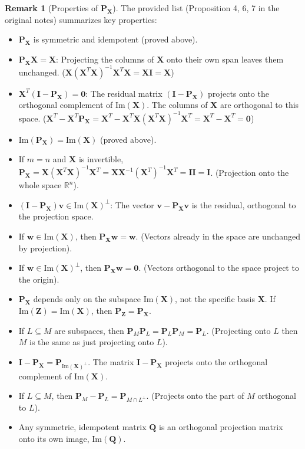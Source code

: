 \documentclass[12pt, letterpaper]{article}
\theoremstyle{definition}
\newtheorem{remark}{Remark}[section]
\newcommand{\R}{\mathbb{R}}
\newcommand{\mat}[1]{\mathbf{#1}} %
\newcommand{\vect}[1]{\mathbf{#1}} %
\renewcommand{\v}{\vect{v}} %
\newcommand{\w}{\vect{w}} %
\newcommand{\im}{\text{Im}}
\begin{document}
\begin{remark}[Properties of $\mat{P}_\mat{X}$]
The provided list (Proposition 4, 6, 7 in the original notes) summarizes key properties:
\begin{itemize}
    \item $\mat{P}_\mat{X}$ is symmetric and idempotent (proved above).
    \item $\mat{P}_\mat{X} \mat{X} = \mat{X}$: Projecting the columns of $\mat{X}$ onto their own span leaves them unchanged. ($\mat{X}(\mat{X}^T \mat{X})^{-1} \mat{X}^T \mat{X} = \mat{X}\mat{I} = \mat{X}$)
    \item $\mat{X}^T (\mat{I} - \mat{P}_\mat{X}) = \mat{0}$: The residual matrix $(\mat{I} - \mat{P}_\mat{X})$ projects onto the orthogonal complement of $\im(\mat{X})$. The columns of $\mat{X}$ are orthogonal to this space. ($\mat{X}^T - \mat{X}^T\mat{P}_\mat{X} = \mat{X}^T - \mat{X}^T\mat{X}(\mat{X}^T \mat{X})^{-1} \mat{X}^T = \mat{X}^T - \mat{X}^T = \mat{0}$)
    \item $\im(\mat{P}_\mat{X}) = \im(\mat{X})$ (proved above).
    \item If $m=n$ and $\mat{X}$ is invertible, $\mat{P}_\mat{X} = \mat{X}(\mat{X}^T \mat{X})^{-1} \mat{X}^T = \mat{X} \mat{X}^{-1} (\mat{X}^T)^{-1} \mat{X}^T = \mat{I} \mat{I} = \mat{I}$. (Projection onto the whole space $\R^n$).
    \item $(\mat{I} - \mat{P}_\mat{X})\v \in \im(\mat{X})^\perp$: The vector $\v - \mat{P}_\mat{X}\v$ is the residual, orthogonal to the projection space.
    \item If $\w \in \im(\mat{X})$, then $\mat{P}_\mat{X}\w = \w$. (Vectors already in the space are unchanged by projection).
    \item If $\w \in \im(\mat{X})^\perp$, then $\mat{P}_\mat{X}\w = \vect{0}$. (Vectors orthogonal to the space project to the origin).
    \item $\mat{P}_\mat{X}$ depends only on the subspace $\im(\mat{X})$, not the specific basis $\mat{X}$. If $\im(\mat{Z}) = \im(\mat{X})$, then $\mat{P}_\mat{Z} = \mat{P}_\mat{X}$.
    \item If $L \subseteq M$ are subspaces, then $\mat{P}_M \mat{P}_L = \mat{P}_L \mat{P}_M = \mat{P}_L$. (Projecting onto $L$ then $M$ is the same as just projecting onto $L$).
    \item $\mat{I} - \mat{P}_\mat{X} = \mat{P}_{\im(\mat{X})^\perp}$. The matrix $\mat{I} - \mat{P}_\mat{X}$ projects onto the orthogonal complement of $\im(\mat{X})$.
    \item If $L \subseteq M$, then $\mat{P}_M - \mat{P}_L = \mat{P}_{M \cap L^\perp}$. (Projects onto the part of $M$ orthogonal to $L$).
    \item Any symmetric, idempotent matrix $\mat{Q}$ is an orthogonal projection matrix onto its own image, $\im(\mat{Q})$.
\end{itemize}
\end{remark}
\end{document}
